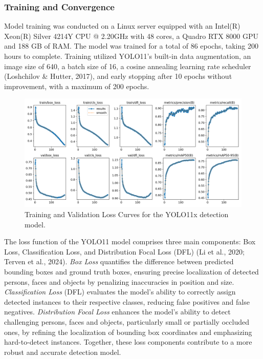 \documentclass[
  man,floatsintext]{apa6}
\begin{document}
\subsubsection{Training and Convergence}\label{sup-training-face}

Model training was conducted on a Linux server equipped with an Intel(R) Xeon(R) Silver 4214Y CPU @ 2.20GHz with 48 cores, a Quadro RTX 8000 GPU and 188 GB of RAM. The model was trained for a total of 86 epochs, taking 200 hours to complete. Training utilized YOLO11's built-in data augmentation, an image size of 640, a batch size of 16, a cosine annealing learning rate scheduler (Loshchilov \& Hutter, 2017), and early stopping after 10 epochs without improvement, with a maximum of 200 epochs.

\begin{figure}

{\centering \includegraphics[width=450px]{images/yolo_loss_curves} 

}

\caption{Training and Validation Loss Curves for the YOLO11x detection model.}\label{fig:det-loss-curves}
\end{figure}

The loss function of the YOLO11 model comprises three main components: Box Loss, Classification Loss, and Distribution Focal Loss (DFL) (Li et al., 2020; Terven et al., 2024). \emph{Box Loss} quantifies the difference between predicted bounding boxes and ground truth boxes, ensuring precise localization of detected persons, faces and objects by penalizing inaccuracies in position and size. \emph{Classification Loss} (DFL) evaluates the model's ability to correctly assign detected instances to their respective classes, reducing false positives and false negatives. \emph{Distribution Focal Loss} enhances the model's ability to detect challenging persons, faces and objects, particularly small or partially occluded ones, by refining the localization of bounding box coordinates and emphasizing hard-to-detect instances. Together, these loss components contribute to a more robust and accurate detection model.
\end{document}
